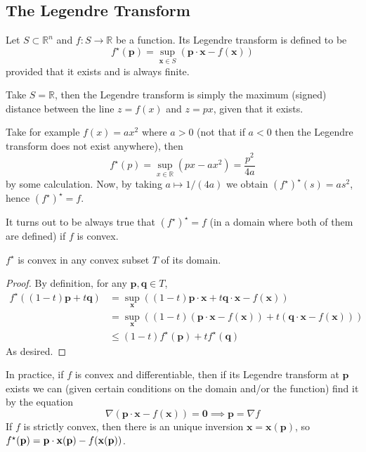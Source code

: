 \documentclass[a4paper]{article}
\begin{document}
\subsection{The Legendre Transform}
\begin{definition}
    Let $S\subset\mathbb R^n$ and $f:S\to\mathbb R$ be a function.
    Its Legendre transform is defined to be
    $$f^\star(\mathbf{p})=\sup_{\mathbf{x}\in S}(\mathbf{p}\cdot\mathbf{x}-f(\mathbf{x}))$$
    provided that it exists and is always finite.
\end{definition}
\begin{example}
    Take $S=\mathbb R$, then the Legendre transform is simply the maximum (signed) distance between the line $z=f(x)$ and $z=px$, given that it exists.

    Take for example $f(x)=ax^2$ where $a>0$ (not that if $a<0$ then the Legendre transform does not exist anywhere), then
    $$f^\star(p)=\sup_{x\in\mathbb R}(px-ax^2)=\frac{p^2}{4a}$$
    by some calculation.
    Now, by taking $a\mapsto 1/(4a)$ we obtain $(f^\star)^\star(s)=as^2$, hence $(f^\star)^\star=f$.
\end{example}
It turns out to be always true that $(f^\star)^\star=f$ (in a domain where both of them are defined) if $f$ is convex.
\begin{proposition}
    $f^\star$ is convex in any convex subset $T$ of its domain.
\end{proposition}
\begin{proof}
    By definition, for any $\mathbf{p},\mathbf{q}\in T$,
    \begin{align*}
        f^\star((1-t)\mathbf{p}+t\mathbf{q})&=\sup_{\mathbf{x}}((1-t)\mathbf{p}\cdot\mathbf{x}+t\mathbf{q}\cdot\mathbf{x}-f(\mathbf{x}))\\
        &=\sup_{\mathbf{x}}((1-t)(\mathbf{p}\cdot\mathbf{x}-f(\mathbf{x}))+t(\mathbf{q}\cdot\mathbf{x}-f(\mathbf{x})))\\
        &\le (1-t)f^{\star}(\mathbf{p})+tf^\star(\mathbf{q})
    \end{align*}
    As desired.
\end{proof}
In practice, if $f$ is convex and differentiable, then if its Legendre transform at $\mathbf{p}$ exists we can (given certain conditions on the domain and/or the function) find it by the equation
$$\nabla(\mathbf{p}\cdot\mathbf{x}-f(\mathbf{x}))=\mathbf{0}\implies \mathbf{p}=\nabla f$$
If $f$ is strictly convex, then there is an unique inversion $\mathbf{x}=\mathbf{x}(\mathbf{p})$, so $f^\star({\bf p})=\mathbf{p}\cdot\mathbf{x}(\mathbf{p})-f(\mathbf{x}(\mathbf{p}))$.
\newpage
\end{document}

